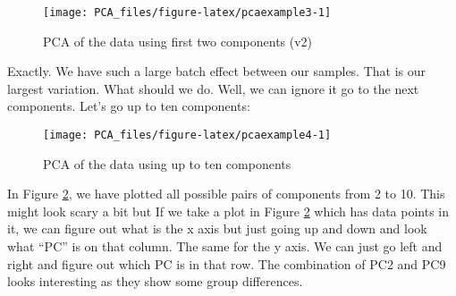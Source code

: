 \documentclass[
]{book}
\newenvironment{Shaded}{\begin{snugshade}}{\end{snugshade}}
\newcommand{\CommentTok}[1]{\textcolor[rgb]{0.56,0.35,0.01}{\textit{#1}}}
\newcommand{\DataTypeTok}[1]{\textcolor[rgb]{0.13,0.29,0.53}{#1}}
\newcommand{\DecValTok}[1]{\textcolor[rgb]{0.00,0.00,0.81}{#1}}
\newcommand{\KeywordTok}[1]{\textcolor[rgb]{0.13,0.29,0.53}{\textbf{#1}}}
\newcommand{\NormalTok}[1]{#1}
\newcommand{\OperatorTok}[1]{\textcolor[rgb]{0.81,0.36,0.00}{\textbf{#1}}}
\newcommand{\StringTok}[1]{\textcolor[rgb]{0.31,0.60,0.02}{#1}}
\theoremstyle{definition}
\theoremstyle{definition}
\theoremstyle{definition}
\theoremstyle{remark}
\begin{document}
\begin{figure}

{\centering \texttt{[image: PCA\_files/figure-latex/pcaexample3-1]} 

}

\caption{PCA of the data using first two components (v2)}\label{fig:pcaexample3}
\end{figure}

Exactly. We have such a large batch effect between our samples. That is our largest variation. What should we do. Well, we can ignore it go to the next components. Let's go up to ten components:

\begin{Shaded}
\end{Shaded}

\begin{figure}

{\centering \texttt{[image: PCA\_files/figure-latex/pcaexample4-1]} 

}

\caption{PCA of the data using up to ten components}\label{fig:pcaexample4}
\end{figure}

In Figure \ref{fig:pcaexample4}, we have plotted all possible pairs of components from 2 to 10. This might look scary a bit but If we take a plot in Figure \ref{fig:pcaexample4} which has data points in it, we can figure out what is the x axis but just going up and down and look what ``PC'' is on that column. The same for the y axis. We can just go left and right and figure out which PC is in that row. The combination of PC2 and PC9 looks interesting as they show some group differences.
\end{document}
